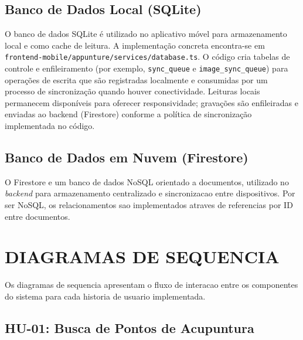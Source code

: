 \begin{apendicesenv}
\section{Banco de Dados Local (SQLite)}

O banco de dados SQLite é utilizado no aplicativo móvel para armazenamento local e como cache de leitura. A implementação concreta encontra-se em \texttt{frontend-mobile/appunture/services/database.ts}. O código cria tabelas de controle e enfileiramento (por exemplo, \texttt{sync\_queue} e \texttt{image\_sync\_queue}) para operações de escrita que são registradas localmente e consumidas por um processo de sincronização quando houver conectividade. Leituras locais permanecem disponíveis para oferecer responsividade; gravações são enfileiradas e enviadas ao backend (Firestore) conforme a política de sincronização implementada no código.


\section{Banco de Dados em Nuvem (Firestore)}

O Firestore e um banco de dados NoSQL orientado a documentos, utilizado no \textit{backend} para armazenamento centralizado e sincronizacao entre dispositivos. Por ser NoSQL, os relacionamentos sao implementados atraves de referencias por ID entre documentos.


\chapter{DIAGRAMAS DE SEQUENCIA}
\label{apendice:sequencia}

Os diagramas de sequencia apresentam o fluxo de interacao entre os componentes do sistema para cada historia de usuario implementada.

\section{HU-01: Busca de Pontos de Acupuntura}
\label{apendice:seq-busca}


\end{apendicesenv}
